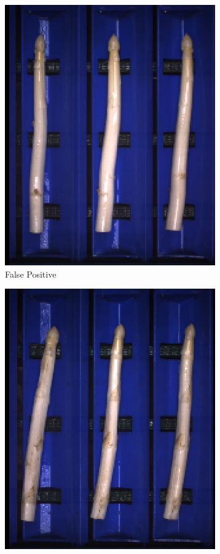 \begin{figure}[h]
	\begin{subfigure}{0.3\textwidth}
		\includegraphics[width=0.9\linewidth]{Figures/appendix/thin_falsepositive_01.png}
		\vspace{-5pt} 
		\caption{False Positive}
	\end{subfigure}
	\begin{subfigure}{0.3\textwidth}
		\includegraphics[width=0.9\linewidth]{Figures/appendix/thin_falsepositive_02.png}

\end{subfigure}
\end{figure}
